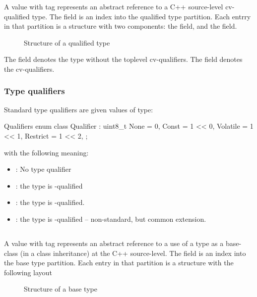 A  value with tag  represents
an abstract reference to a C++ source-level cv-qualified type.
The  field is an index into the qualified type partition.
Each entrry in that partition is a structure with two components: the  field,
and the  field.
%
\begin{figure}[H]
	\centering
	\caption{Structure of a qualified type}
	\label{fig:ifc-qualified-type-structure}
\end{figure}
%
The  field denotes the type without the toplevel cv-qualifiers.
The  field denotes the cv-qualifiers.


\subsubsection{Type qualifiers}
\label{sec:ifc-type-qualifiers}

Standard type qualifiers are given values of type:
\begin{typedef}{Qualifiers}{}
	enum class Qualifier : uint8_t {
		None		= 0,
		Const		= 1 << 0,
		Volatile		= 1 << 1,
		Restrict		= 1 << 2,
	};
\end{typedef}
with the following meaning:
\begin{itemize}
	\item {}: No type qualifier
	\item {}: the type is -qualified
	\item {}: the type is -qualified.
	\item {}: the type is -qualified -- non-standard, but common extension.
\end{itemize}


\subsection{}
\label{sec:ifc:TypeSort:Base}

A  value with tag  represents an
abstract reference to a use of a type as a base-class (in a class inheritance)
at the C++ source-level.
The  field is an index into the base type partition.
Each entry in that partition is a structure with the following layout
%
\begin{figure}[H]
	\centering
	\caption{Structure of a base type}
	\label{fig:ifc-base-type-structure}
\end{figure}
%

